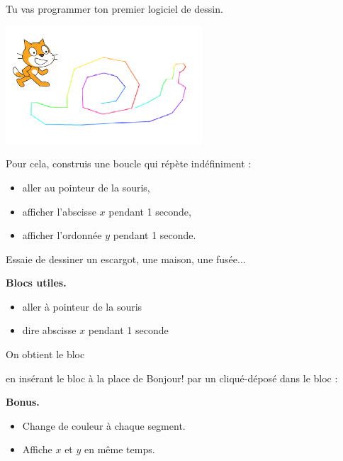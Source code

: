\documentclass[class=report,crop=false, 12pt]{standalone}
\begin{document}
\begin{activite}
Tu vas programmer ton premier logiciel de dessin.

\begin{center}
  \includegraphics[width=0.55\textwidth]{ecran-03-ex2}   
\end{center}

Pour cela, construis une boucle qui répète indéfiniment :
\begin{itemize}
  \item aller au pointeur de la souris,
  \item afficher l'abscisse $x$ pendant 1 seconde,
  \item afficher l'ordonnée $y$ pendant 1 seconde.
\end{itemize}

Essaie de dessiner un escargot, une maison, une fusée...

\bigskip

\textbf{Blocs utiles.}
\begin{itemize}
  \item \og{}aller à pointeur de la souris\fg{}
  \item \og{}dire abscisse $x$ pendant 1 seconde\fg{}
\end{itemize}

{
On obtient le bloc 
\begin{scratch}
\end{scratch}
en insérant le bloc  à la place de \og{}Bonjour!\fg{} par un \og{}cliqué-déposé\fg{} dans le bloc : 
\begin{scratch}
\end{scratch}
}

\bigskip

\textbf{Bonus.}
\begin{itemize}
  \item Change de couleur à chaque segment.
  \item Affiche $x$ et $y$ en même temps.
\end{itemize}


\end{activite}
\end{document}
